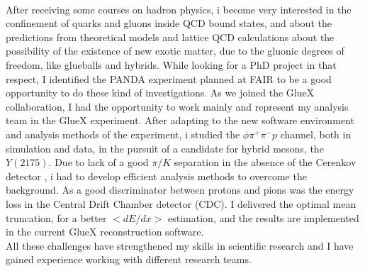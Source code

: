 \documentclass[a4paper,roman]{article}
\begin{document}
~\par After receiving some courses on hadron physics, i become very interested in the confinement of quarks and gluons inside QCD bound states, and about the predictions from theoretical models and lattice QCD calculations about the possibility of the existence of new exotic matter, due to the gluonic degrees of freedom, like glueballs and hybrids. While looking for a PhD project in that respect, I identified the PANDA experiment planned at FAIR to be a good opportunity to do these kind of investigations. As we joined the GlueX collaboration, I had the opportunity to work mainly and represent my analysis team in the GlueX experiment. After adapting to the new software environment and analysis methods of the experiment, i studied the $\phi\pi^{+}\pi^{-}p$ channel, both in simulation and data, in the pursuit of a candidate for hybrid mesons, the $Y(2175)$. Due to lack of a good $\pi/K$ separation in the absence of the Cerenkov detector , i had to develop efficient analysis methods to overcome the background. As a good discriminator between protons and pions was the energy loss in the Central Drift Chamber detector (CDC). I delivered the optimal mean truncation, for a better $<dE/dx>$ estimation, and the results are implemented in the current GlueX reconstruction software.\\
All these challenges have strengthened my skills in scientific research and I have gained experience working with different research teams.
\end{document}
